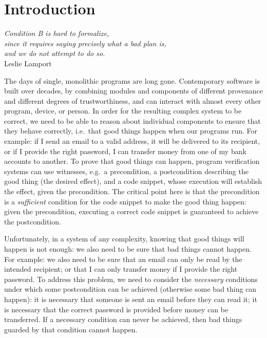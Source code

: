 \renewcommand{\sophia}[2][]{\ponders{Sophia}{blue}{#1} \textcolor{blue}{#2}\xspace}


\section{Introduction}


\begin{flushright}
  \textit{Condition B is hard to formalize, \\since it requires saying precisely what a bad
plan is,\\ and we do not attempt to do so.}\\
  Leslie Lamport
\end{flushright}

The days of single, monolithic programs are long gone.  Contemporary
software is built over decades, by combining modules and components of
different provenance and different degrees of trustworthiness, and can
interact with almost every other program, device, or person.
In order for the resulting complex system to be correct, we need to be
able to reason about individual components to ensure that they behave
correctly, i.e.\ that good things happen when our programs run.
For example: if I send an email to a valid address, it will be
delivered to its recipient, or if I provide the right password, I can
transfer money from one of my bank accounts to another. 
To prove that good things can
happen, program verification systems can use witnesses, e.g.\ a
precondition, a postcondition describing the good thing (the desired
effect), and a code snippet, whose execution will establish the
effect, given the precondition.  The critical point here is that the
precondition is a \emph{sufficient} condition for the code snippet to
make the good thing happen: given the precondition, executing a
correct code snippet is guaranteed to achieve the postcondition.

Unfortunately, in a system of any complexity, knowing that good things
will happen is not enough: we also need to be sure that bad things
cannot happen. For example: we also need to be sure that an email can
only be read by the intended recipient; or that I can only transfer
money if I provide the right password. To address this problem,
we need to consider the \emph{necessary} conditions under which some
postcondition can be achieved (otherwise some bad thing can happen):
it is necessary that someone is sent an email before they can read it;
it is necessary that the correct password is provided before money can
be transferred.  If a necessary condition can never be achieved, then
bad things guarded by that condition cannot happen.

